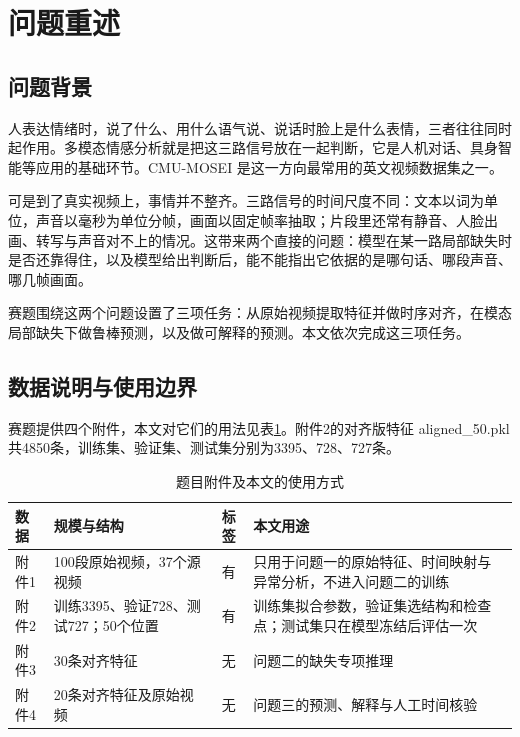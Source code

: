 \section{问题重述}

\subsection{问题背景}

人表达情绪时，说了什么、用什么语气说、说话时脸上是什么表情，三者往往同时起作用。多模态情感分析就是把这三路信号放在一起判断，它是人机对话、具身智能等应用的基础环节。CMU-MOSEI 是这一方向最常用的英文视频数据集之一\cite{zadeh2018mosei}。

可是到了真实视频上，事情并不整齐。三路信号的时间尺度不同：文本以词为单位，声音以毫秒为单位分帧，画面以固定帧率抽取；片段里还常有静音、人脸出画、转写与声音对不上的情况。这带来两个直接的问题：模型在某一路局部缺失时是否还靠得住，以及模型给出判断后，能不能指出它依据的是哪句话、哪段声音、哪几帧画面。

赛题围绕这两个问题设置了三项任务：从原始视频提取特征并做时序对齐，在模态局部缺失下做鲁棒预测，以及做可解释的预测。本文依次完成这三项任务。

\subsection{数据说明与使用边界}\label{sec:data}

赛题提供四个附件，本文对它们的用法见表\ref{tab:data}。附件2的对齐版特征 aligned\_50.pkl 共4850条，训练集、验证集、测试集分别为3395、728、727条。

\begin{table}[htbp]
\centering
\caption{题目附件及本文的使用方式}
\label{tab:data}
\begin{tabularx}{\textwidth}{l>{\raggedright\arraybackslash}p{3.3cm}c>{\raggedright\arraybackslash}X}
\toprule
数据 & 规模与结构 & 标签 & 本文用途 \\
\midrule
附件1 & 100段原始视频，37个源视频 & 有 & 只用于问题一的原始特征、时间映射与异常分析，不进入问题二的训练 \\
附件2 & 训练3395、验证728、测试727；50个位置 & 有 & 训练集拟合参数，验证集选结构和检查点；测试集只在模型冻结后评估一次 \\
附件3 & 30条对齐特征 & 无 & 问题二的缺失专项推理 \\
附件4 & 20条对齐特征及原始视频 & 无 & 问题三的预测、解释与人工时间核验 \\
\bottomrule
\end{tabularx}
\end{table}

